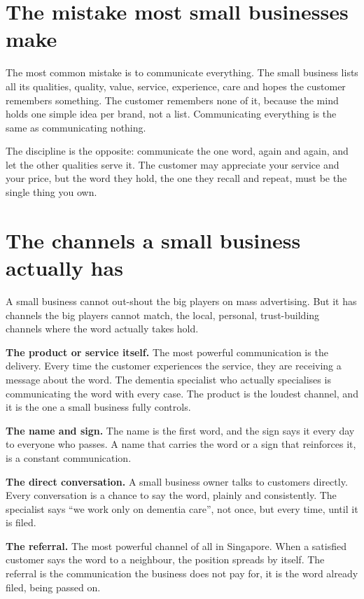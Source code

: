 \documentclass[10pt,twoside,openany]{memoir}
\newcommand{\needspacehead}{\needspace{4\baselineskip}}
\let\oldsection\section
\renewcommand{\section}{\needspacehead\oldsection}
\begin{document}
\section{The mistake most small businesses
make}\label{the-mistake-most-small-businesses-make}

The most common mistake is to communicate everything. The small business
lists all its qualities, quality, value, service, experience, care and
hopes the customer remembers something. The customer remembers none of
it, because the mind holds one simple idea per brand, not a list.
Communicating everything is the same as communicating nothing.

The discipline is the opposite: communicate the one word, again and
again, and let the other qualities serve it. The customer may appreciate
your service and your price, but the word they hold, the one they recall
and repeat, must be the single thing you own.

\section{The channels a small business actually
has}\label{the-channels-a-small-business-actually-has}

A small business cannot out-shout the big players on mass advertising.
But it has channels the big players cannot match, the local, personal,
trust-building channels where the word actually takes hold.

\textbf{The product or service itself.} The most powerful communication
is the delivery. Every time the customer experiences the service, they
are receiving a message about the word. The dementia specialist who
actually specialises is communicating the word with every case. The
product is the loudest channel, and it is the one a small business fully
controls.

\textbf{The name and sign.} The name is the first word, and the sign
says it every day to everyone who passes. A name that carries the word
or a sign that reinforces it, is a constant communication.

\textbf{The direct conversation.} A small business owner talks to
customers directly. Every conversation is a chance to say the word,
plainly and consistently. The specialist says ``we work only on dementia
care'', not once, but every time, until it is filed.

\textbf{The referral.} The most powerful channel of all in Singapore.
When a satisfied customer says the word to a neighbour, the position
spreads by itself. The referral is the communication the business does
not pay for, it is the word already filed, being passed on.
\end{document}

